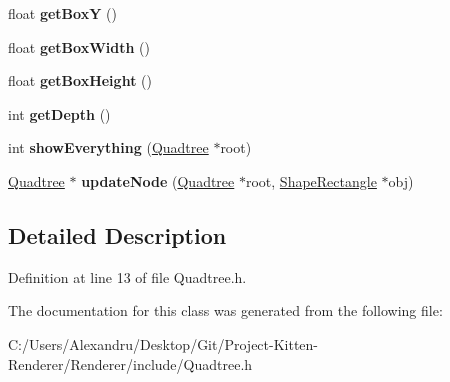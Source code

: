 \begin{DoxyCompactItemize}
\item 
\hypertarget{class_quadtree_acbd9561eb50ed4940167f14898293609}{}float {\bfseries get\+Box\+Y} ()\label{class_quadtree_acbd9561eb50ed4940167f14898293609}

\item 
\hypertarget{class_quadtree_a9455406c616eab15386ddcdd18349f04}{}float {\bfseries get\+Box\+Width} ()\label{class_quadtree_a9455406c616eab15386ddcdd18349f04}

\item 
\hypertarget{class_quadtree_a3f19ef40fe8850ee3f229bb6051d6180}{}float {\bfseries get\+Box\+Height} ()\label{class_quadtree_a3f19ef40fe8850ee3f229bb6051d6180}

\item 
\hypertarget{class_quadtree_a6fdf3ccffe31fe06711b3bf69daba79c}{}int {\bfseries get\+Depth} ()\label{class_quadtree_a6fdf3ccffe31fe06711b3bf69daba79c}

\item 
\hypertarget{class_quadtree_a57d8f304e79f9a654112d4106601afa3}{}int {\bfseries show\+Everything} (\hyperlink{class_quadtree}{Quadtree} $\ast$root)\label{class_quadtree_a57d8f304e79f9a654112d4106601afa3}

\item 
\hypertarget{class_quadtree_a592605d3e70dc9b6e51cc84827f8dd94}{}\hyperlink{class_quadtree}{Quadtree} $\ast$ {\bfseries update\+Node} (\hyperlink{class_quadtree}{Quadtree} $\ast$root, \hyperlink{class_shape_rectangle}{Shape\+Rectangle} $\ast$obj)\label{class_quadtree_a592605d3e70dc9b6e51cc84827f8dd94}

\end{DoxyCompactItemize}


\subsection{Detailed Description}


Definition at line 13 of file Quadtree.\+h.



The documentation for this class was generated from the following file\+:\begin{DoxyCompactItemize}
\item 
C\+:/\+Users/\+Alexandru/\+Desktop/\+Git/\+Project-\/\+Kitten-\/\+Renderer/\+Renderer/include/Quadtree.\+h\end{DoxyCompactItemize}
